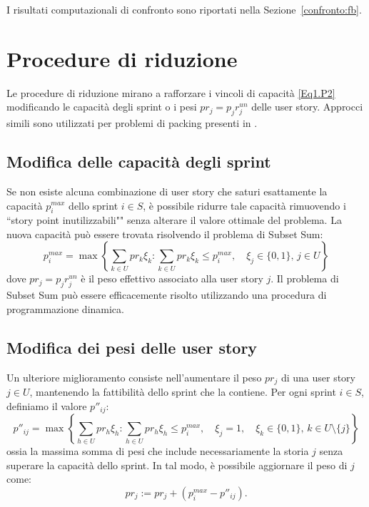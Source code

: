 \documentclass[12pt,a4paper,openright,twoside]{book}
\begin{document}
\vspace{1em}

I risultati computazionali di confronto sono riportati nella Sezione~\ref{confronto:fb}.

\section{Procedure di riduzione} \label{Sec.Red}

Le procedure di riduzione mirano a rafforzare i vincoli di capacità \eqref{Eq1.P2} modificando le capacità degli sprint o i pesi \( pr_j = p_j r_j^{un} \) delle user story. Approcci simili sono utilizzati per problemi di packing presenti in \cite{BHM02,BM03a,BM10}.

\subsection{Modifica delle capacità degli sprint} \label{SubSec.RedSprint}

Se non esiste alcuna combinazione di user story che saturi esattamente la capacità \( p_i^{max} \) dello sprint \( i \in S \), è possibile ridurre tale capacità rimuovendo i ``story point inutilizzabili"" senza alterare il valore ottimale del problema.  
La nuova capacità può essere trovata risolvendo il problema di Subset Sum:
\[
p_i^{max} = \max \left\{ \sum_{k \in U} pr_k \xi_k : \sum_{k \in U} pr_k \xi_k \leq p_i^{max}, \quad \xi_j \in \{0,1\},\, j \in U \right\}
\]
dove \( pr_j = p_j r_j^{un} \) è il peso effettivo associato alla user story \( j \).  
Il problema di Subset Sum può essere efficacemente risolto utilizzando una procedura di programmazione dinamica.

\subsection{Modifica dei pesi delle user story} \label{SubSec.RedUserStories}

Un ulteriore miglioramento consiste nell'aumentare il peso \( pr_j \) di una user story \( j \in U \), mantenendo la fattibilità dello sprint che la contiene.  
Per ogni sprint \( i \in S \), definiamo il valore \(p''_{ij}\):
\[
p''_{ij} = \max \left\{ \sum_{h \in U} pr_h \xi_h : \sum_{h \in U} pr_h \xi_h \leq p_i^{max}, \quad \xi_j = 1, \quad \xi_k \in \{0,1\},\, k \in U \setminus \{j\} \right\}
\]
ossia la massima somma di pesi che include necessariamente la storia \( j \) senza superare la capacità dello sprint.  
In tal modo, è possibile aggiornare il peso di \( j \) come:
\[
pr_j := pr_j + (p_i^{max} - p''_{ij}).
\]
\end{document}
